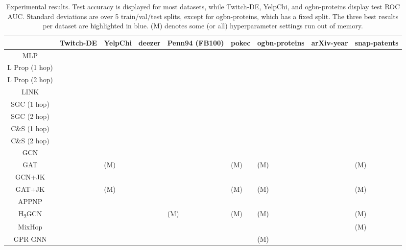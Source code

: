 \documentclass[sigconf, balance=false]{acmart}
\newcommand{\bestcell}{\cellcolor{blue!25}}
\begin{document}
\begin{table*}[ht]
    \centering
    \caption{Experimental results. Test accuracy is displayed for most datasets, while Twitch-DE, YelpChi, and ogbn-proteins display test ROC AUC. Standard deviations are over 5 train/val/test splits, except for ogbn-proteins, which has a fixed split. The three best results per dataset are highlighted in \colorbox{blue!25}{blue}. (M) denotes some  (or all) hyperparameter settings run out of memory.}
    \label{tab:results}
    {\footnotesize
    \begin{tabular}{cllllllll}
    \toprule
     & Twitch-DE & YelpChi & deezer & Penn94 (FB100)  & pokec &  ogbn-proteins & arXiv-year & snap-patents  \\
    \midrule
     MLP &  & \bestcell  &  &  &  &  &  &   \\    
     \hdashline
     L Prop (1 hop) &   &   &  &  &  & \bestcell  &  &    \\    
     L Prop (2 hop) &   &  &  &  &  &  &  &  \\
     LINK &  &   &  &  & \bestcell  &  & \bestcell  & \bestcell  \\    
     \hdashline
     SGC (1 hop) &  &  &  &  &  &  &   &    \\    
     SGC (2 hop) & \bestcell  &   &  &  &  &  &  &   \\    
     C\&S (1 hop) &  &  &  &  &  &  &  &  \\    
     C\&S (2 hop) &  &  &  &  &   &  &  &  \\    
     \hdashline
     GCN & \bestcell  &  &  & \bestcell  &  &  &  &  \\
     GAT &  &  (M) &  &  &  (M) & (M) &  &  (M)  \\
     GCN+JK &  & 	&  &  &  & \bestcell  &   & \bestcell   \\
     GAT+JK &   & \bestcell   (M) &  &  &  (M) & (M) &  &  (M) \\
     APPNP &  &  & \bestcell  &  &  &  &   &  \\
     \hdashline
     H\textsubscript{2}GCN &  & \bestcell   & \bestcell  & (M) & (M) & (M) & \bestcell  & (M) \\
     MixHop &  &   &  & \bestcell  & \bestcell  & \bestcell  & \bestcell  & \bestcell  (M) \\
     GPR-GNN & \bestcell  &  & \bestcell  & \bestcell  & \bestcell  & (M)  &   &    \\
    \bottomrule
    \end{tabular}
    }
    \vspace{10pt}
\end{table*}
\end{document}

